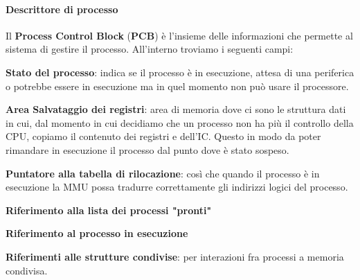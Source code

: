 \documentclass[10pt]{report}
\begin{document}
\paragraph{Descrittore di processo} Il \textbf{Process Control Block} (\textbf{PCB}) è l'insieme delle informazioni che permette al sistema di gestire il processo. All'interno troviamo i seguenti campi:
\begin{list}{}{}
	\item \textbf{Stato del processo}: indica se il processo è in esecuzione, attesa di una periferica o potrebbe essere in esecuzione ma in quel momento non può usare il processore.
	\item \textbf{Area Salvataggio dei registri}: area di memoria dove ci sono le struttura dati in cui, dal momento in cui decidiamo che un processo non ha più il controllo della CPU, copiamo il contenuto dei registri e dell'IC. Questo in modo da poter rimandare in esecuzione il processo dal punto dove è stato sospeso.
	\item \textbf{Puntatore alla tabella di rilocazione}: così che quando il processo è in esecuzione la MMU possa tradurre correttamente gli indirizzi logici del processo.
	\item \textbf{Riferimento alla lista dei processi "pronti"}
	\item \textbf{Riferimento al processo in esecuzione}
	\item \textbf{Riferimenti alle strutture condivise}: per interazioni fra processi a memoria condivisa.
\end{list}
\pagebreak
\end{document}

